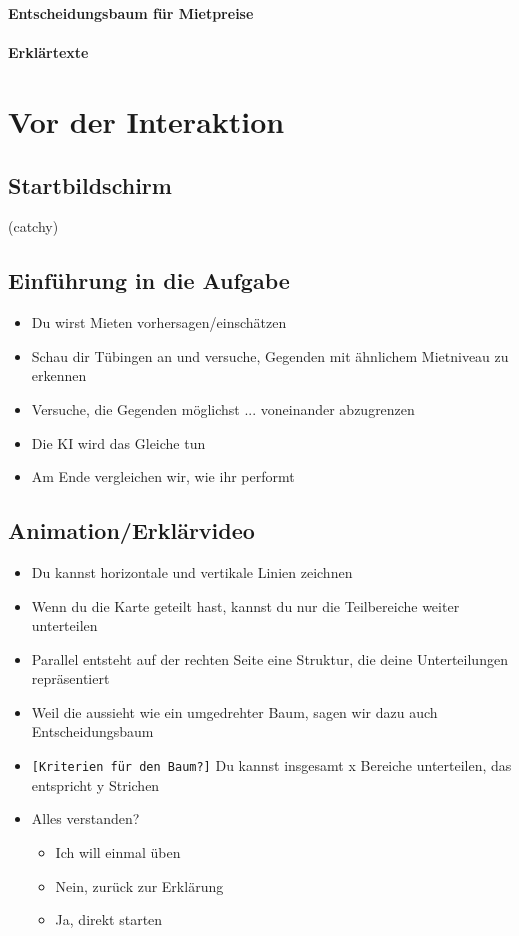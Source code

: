 \documentclass[12pt]{article}
\begin{document}
\textbf{Entscheidungsbaum für Mietpreise}\\
\\
\textbf{\Huge Erklärtexte}

\tableofcontents

\newpage

\section{Vor der Interaktion}

\subsection{Startbildschirm}
(catchy)

\subsection{Einführung in die Aufgabe}
\begin{itemize}
    \item Du wirst Mieten vorhersagen/einschätzen
    \item Schau dir Tübingen an und versuche, Gegenden mit ähnlichem Mietniveau zu erkennen
    \item Versuche, die Gegenden möglichst ... voneinander abzugrenzen
    \item Die KI wird das Gleiche tun
    \item Am Ende vergleichen wir, wie ihr performt
\end{itemize}

\subsection{Animation/Erklärvideo}
\begin{itemize}
    \item Du kannst horizontale und vertikale Linien zeichnen 
    \item Wenn du die Karte geteilt hast, kannst du nur die Teilbereiche weiter unterteilen
    \item Parallel entsteht auf der rechten Seite eine Struktur, die deine Unterteilungen repräsentiert 
    \item Weil die aussieht wie ein umgedrehter Baum, sagen wir dazu auch Entscheidungsbaum
    \item \texttt{[Kriterien für den Baum?]} Du kannst insgesamt x Bereiche unterteilen, das entspricht y Strichen
    \item Alles verstanden?
    \begin{itemize}
        \item Ich will einmal üben
        \item Nein, zurück zur Erklärung
        \item Ja, direkt starten
    \end{itemize}
\end{itemize}
\end{document}
